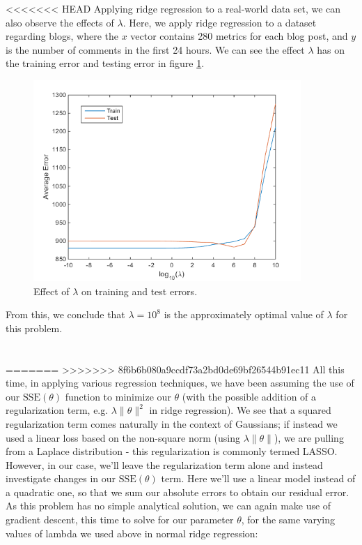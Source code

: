 \documentclass[11pt,letterpaper]{article}
\begin{document}
<<<<<<< HEAD
Applying ridge regression to a real-world data set, we can also observe the effects of $\lambda$. Here, we apply ridge regression to a dataset regarding blogs, where the $x$ vector contains 280 metrics for each blog post, and $y$ is the number of comments in the first 24 hours. We can see the effect $\lambda$ has on the training error and testing error in figure \ref{fig:blogData}.

\begin{figure}[!htb]
\begin{center}
\includegraphics[width=4in]{figures/blogData.png}
\caption{Effect of $\lambda$ on training and test errors.}\label{fig:blogData}
\end{center}
\end{figure}

From this, we conclude that $\lambda=10^8$ is the approximately optimal value of $\lambda$ for this problem.

\section{}
=======
>>>>>>> 8f6b6b080a9ccdf73a2bd0de69bf26544b91ec11
All this time, in applying various regression techniques, we have been assuming the use of our $\text{SSE}(\theta)$ function to minimize our $\theta$ (with the possible addition of a regularization term, e.g. $\lambda\lVert\theta\rVert^2$ in ridge regression). We see that a squared regularization term comes naturally in the context of Gaussians; if instead we used a linear loss based on the non-square norm (using $\lambda\lVert\theta\rVert$), we are pulling from a Laplace distribution - this regularization is commonly termed LASSO.\\
However, in our case, we'll leave the regularization term alone and instead investigate changes in our $\text{SSE}(\theta)$ term. Here we'll use a linear model instead of a quadratic one, so that we sum our absolute errors to obtain our residual error.\\
As this problem has no simple analytical solution, we can again make use of gradient descent, this time to solve for our parameter $\theta$, for the same varying values of lambda we used above in normal ridge regression:
\end{document}
